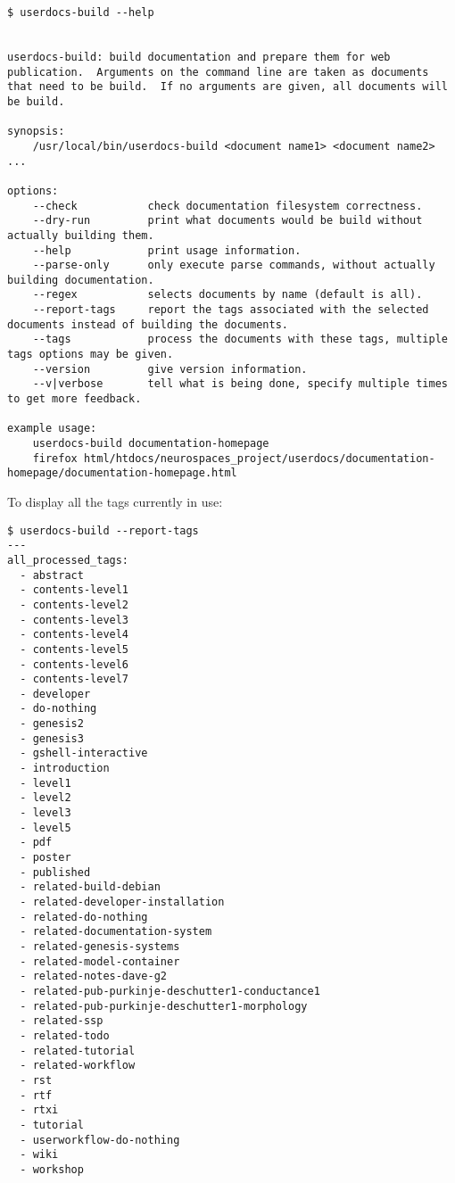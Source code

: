 \documentclass[12pt]{article}
\begin{document}
\begin{verbatim}
$ userdocs-build --help


userdocs-build: build documentation and prepare them for web
publication.  Arguments on the command line are taken as documents
that need to be build.  If no arguments are given, all documents will
be build.

synopsis:
    /usr/local/bin/userdocs-build <document name1> <document name2> ...

options:
    --check           check documentation filesystem correctness.
    --dry-run         print what documents would be build without actually building them.
    --help            print usage information.
    --parse-only      only execute parse commands, without actually building documentation.
    --regex           selects documents by name (default is all).
    --report-tags     report the tags associated with the selected documents instead of building the documents.
    --tags            process the documents with these tags, multiple tags options may be given.
    --version         give version information.
    --v|verbose       tell what is being done, specify multiple times to get more feedback.

example usage:
    userdocs-build documentation-homepage
    firefox html/htdocs/neurospaces_project/userdocs/documentation-homepage/documentation-homepage.html

\end{verbatim}

To display all the tags currently in use:

\begin{verbatim}
$ userdocs-build --report-tags
---
all_processed_tags:
  - abstract
  - contents-level1
  - contents-level2
  - contents-level3
  - contents-level4
  - contents-level5
  - contents-level6
  - contents-level7
  - developer
  - do-nothing
  - genesis2
  - genesis3
  - gshell-interactive
  - introduction
  - level1
  - level2
  - level3
  - level5
  - pdf
  - poster
  - published
  - related-build-debian
  - related-developer-installation
  - related-do-nothing
  - related-documentation-system
  - related-genesis-systems
  - related-model-container
  - related-notes-dave-g2
  - related-pub-purkinje-deschutter1-conductance1
  - related-pub-purkinje-deschutter1-morphology
  - related-ssp
  - related-todo
  - related-tutorial
  - related-workflow
  - rst
  - rtf
  - rtxi
  - tutorial
  - userworkflow-do-nothing
  - wiki
  - workshop
\end{verbatim}
\end{document}
